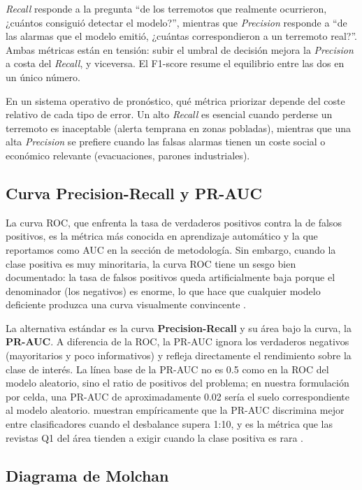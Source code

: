 \textit{Recall} responde a la pregunta ``de los terremotos que realmente ocurrieron, ¿cuántos consiguió detectar el modelo?'', mientras que \textit{Precision} responde a ``de las alarmas que el modelo emitió, ¿cuántas correspondieron a un terremoto real?''. Ambas métricas están en tensión: subir el umbral de decisión mejora la \textit{Precision} a costa del \textit{Recall}, y viceversa. El F1-score resume el equilibrio entre las dos en un único número.

En un sistema operativo de pronóstico, qué métrica priorizar depende del coste relativo de cada tipo de error. Un alto \textit{Recall} es esencial cuando perderse un terremoto es inaceptable (alerta temprana en zonas pobladas), mientras que una alta \textit{Precision} se prefiere cuando las falsas alarmas tienen un coste social o económico relevante (evacuaciones, parones industriales).

\subsection{Curva Precision-Recall y PR-AUC}
\label{pr-auc}

La curva ROC, que enfrenta la tasa de verdaderos positivos contra la de falsos positivos, es la métrica más conocida en aprendizaje automático y la que reportamos como AUC en la sección de metodología. Sin embargo, cuando la clase positiva es muy minoritaria, la curva ROC tiene un sesgo bien documentado: la tasa de falsos positivos queda artificialmente baja porque el denominador (los negativos) es enorme, lo que hace que cualquier modelo deficiente produzca una curva visualmente convincente \citep{davis2006relationship, saito2015precision}.

La alternativa estándar es la curva \textbf{Precision-Recall} y su área bajo la curva, la \textbf{PR-AUC}. A diferencia de la ROC, la PR-AUC ignora los verdaderos negativos (mayoritarios y poco informativos) y refleja directamente el rendimiento sobre la clase de interés. La línea base de la PR-AUC no es 0.5 como en la ROC del modelo aleatorio, sino el ratio de positivos del problema; en nuestra formulación por celda, una PR-AUC de aproximadamente 0.02 sería el suelo correspondiente al modelo aleatorio. \citet{saito2015precision} muestran empíricamente que la PR-AUC discrimina mejor entre clasificadores cuando el desbalance supera 1:10, y es la métrica que las revistas Q1 del área tienden a exigir cuando la clase positiva es rara \citep{davis2006relationship}.

\subsection{Diagrama de Molchan}
\label{molchan}

